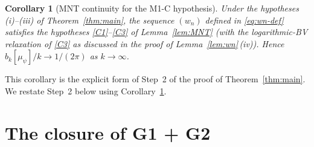 \documentclass[11pt]{article}
\newtheorem{corollary}[theorem]{Corollary}
\theoremstyle{definition}
\begin{document}
\begin{corollary}[MNT continuity for the M1-C hypothesis]\label{cor:MNT-M1C}
Under the hypotheses (i)--(iii) of Theorem~\ref{thm:main}, the
sequence $(w_n)$ defined in \eqref{eq:wn-def} satisfies the
hypotheses \ref{C1}--\ref{C3} of Lemma~\ref{lem:MNT} (with the
logarithmic-BV relaxation of \ref{C3} as discussed in the proof of
Lemma~\ref{lem:wn}\,(iv)).  Hence $b_k[\mu_\psi]/k\to 1/(2\pi)$ as
$k\to\infty$.
\end{corollary}

This corollary is the explicit form of Step~2 of the proof of
Theorem~\ref{thm:main}.  We restate Step~2 below using
Corollary~\ref{cor:MNT-M1C}.

\section{The closure of G1 + G2}\label{sec:closure}
\end{document}
